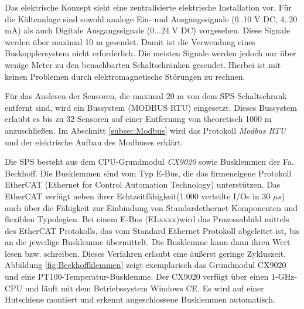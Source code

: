 Das elektrische Konzept sieht eine zentralisierte elektrische Installation vor. Für die Kälteanlage sind sowohl analoge Ein- und Ausgangssignale (0..10 V DC, 4..20 mA) als auch Digitale Ausgangssignale (0...24 V DC) vorgesehen. Diese Signale werden über maximal 10 m gesendet. Damit ist die Verwendung eines Buskopplersystem nicht erforderlich. Die meisten Signale werden jedoch nur über wenige Meter zu den benachbarten Schaltschränken gesendet. Hierbei ist mit keinen Problemen durch elektromagnetische Störungen zu rechnen. 

Für das Auslesen der Sensoren, die maximal  20 m von dem SPS-Schaltschrank entfernt sind, wird ein Bussystem (MODBUS RTU) eingesetzt. Dieses Bussystem erlaubt es bis zu 32 Sensoren auf einer Entfernung von theoretisch 1000 m anzuschließen. Im Abschnitt \ref{subsec:Modbus} wird das Protokoll \textit{Modbus RTU} und der elektrische Aufbau des Modbuses erklärt. 
 
Die SPS besteht aus dem CPU-Grundmodul \textit{CX9020} sowie Busklemmen der Fa. Beckhoff. Die Busklemmen sind vom Typ E-Bus, die das firmeneigene Protokoll EtherCAT (Ethernet for Control Automation Technology) unterstützen.  Das EtherCAT verfügt neben ihrer Echtzeitfähigkeit(1.000 verteilte I/Os in 30 $\mu s$\citep{Beckhoff2016}) auch über die Fähigkeit zur Einbindung von  Standardethernet Komponenten und flexiblen Typologien. Bei einem E-Bus (ELxxxx)wird das Prozessabbild mittels des EtherCAT
Protokolls, das vom Standard Ethernet Protokoll abgeleitet ist, bis an die jeweilige Busklemme übermittelt. Die Busklemme kann dann ihren Wert lesen bzw. schreiben. Dieses Verfahren erlaubt eine äußerst geringe Zykluszeit. Abbildung \ref{fig:Beckhoffklemmen} zeigt exemplarisch das Grundmodul CX9020 und eine PT100-Temperatur-Busklemme. Der CX9020 verfügt über einen 1-GHz-CPU und läuft mit dem Betriebssystem Windows CE. Es wird auf einer Hutschiene montiert und erkennt angeschlossene Busklemmen automatisch. 

